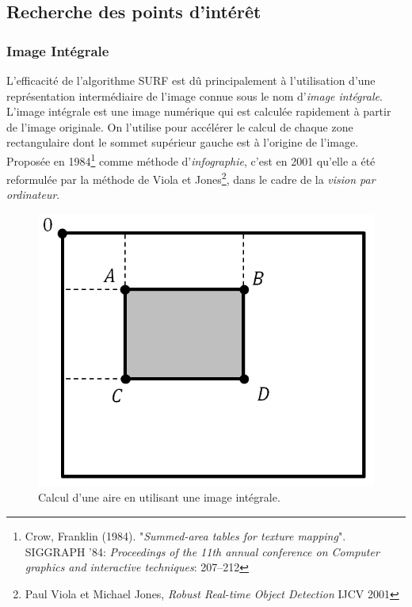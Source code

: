 \documentclass[a4paper,12pt]{report}
\begin{document}
\subsection{Recherche des points d'intérêt}
\subsubsection{Image Intégrale}
L'efficacité de l'algorithme SURF est dû principalement à l'utilisation d'une représentation intermédiaire de l'image connue sous le nom d'\textit{image intégrale}.
\\L'image intégrale est une image numérique qui est calculée rapidement à partir de l'image originale. On l'utilise pour accélérer le calcul de chaque zone rectangulaire dont le sommet supérieur gauche est à l'origine de l'image. 
\\Proposée en 1984\footnote{Crow, Franklin (1984). "\textit{Summed-area tables for texture mapping}". SIGGRAPH '84: \textit{Proceedings of the 11th annual conference on Computer graphics and interactive techniques}: 207–212} comme méthode d'\textit{infographie}, c'est en 2001 qu'elle a été reformulée par la méthode de Viola et Jones\footnote{Paul Viola et Michael Jones, \textit{Robust Real-time Object Detection} IJCV 2001}, dans le cadre de la \textit{vision par ordinateur}.
\begin{figure}[ht]
\centering
\includegraphics[scale=0.3]{figure1.png}
\caption{Calcul d'une aire en utilisant une image intégrale.}
\label{fig1}
\end{figure}
\end{document}
